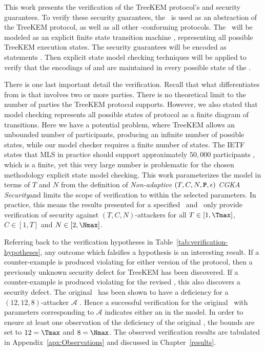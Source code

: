 This work presents the verification of the TreeKEM protocol's  and  security guarantees.
To verify these security guarantees, the \CGKAsec\ is used as an abstraction of the TreeKEM protocol, as well as all other \CGKAdef-conforming protocols.
The \CGKAsec\ will be modeled as an explicit finite state transition machine \autocite{rabin1959finite}, representing all possible TreeKEM execution states.
The security guarantees will be encoded as  statements \autocite{4567924}.
Then explicit state model checking techniques will be applied to verify that the  encodings of  and  are maintained in every possible state of the \CGKAsec.

There is one last important detail the verification.
Recall that what differentiates  from  is that  involves two or more parties.
There is no theoretical limit to the number of parties the TreeKEM protocol supports.
However, we also stated that model checking represents all possible states of protocol as a finite diagram of transitions.
Here we have a potential problem, where TreeKEM allows an unbounded number of participants, producing an infinite number of possible states, while our model checker requires a finite number of states.
The IETF states that MLS in practice should support approximately $50,000$ participants \autocite{Omara2020}, which is a finite, yet this very large number is problematic for the chosen methodology explicit state model checking.
This work parameterizes the model in terms of \(T\) and \(N\) from the definition of \emph{Non-adaptive} \((T, C, N, \textbf{\texttt{P}}, \epsilon)\) \emph{CGKA Security}and limits the scope of verification to within the selected parameters.
In practice, this means the results presented for a specified \Tmax\ and \Nmax\ only provide verification of security against \((T, C, N)\)-attackers for all \(T \in [1, \Tmax]\), \(C \in [1, T]\) and \(N \in [2, \Nmax]\).

Referring back to the verification hypotheses in Table\ \ref{tab:verification-hypotheses}, any outcome which falsifies a hypothesis is an interesting result.
If a counter-example is produced violating  for either version of the protocol, then a previously unknown security defect for TreeKEM has been discovered.
If a counter-example is produced violating  for the revised \VersionTwo, this also discovers a security defect.
The original \VersionOne\ has been shown to have a  deficiency for a \((12, 12, 8)\)-attacker \(\mathcal{A}\) \autocite{alwen2020security}.
Hence a successful  verification for the original \VersionOne\ with parameters corresponding to \(\mathcal{A}\) indicates either an in the model.
In order to ensure at least one observation of the  deficiency of the original \VersionOne, the bounds are set to \(12 = \Tmax\) and \(8 = \Nmax\).
The observed verification results are tabulated in Appendix\ \ref{apx:Observations} and discussed in Chapter\ \ref{results}.


